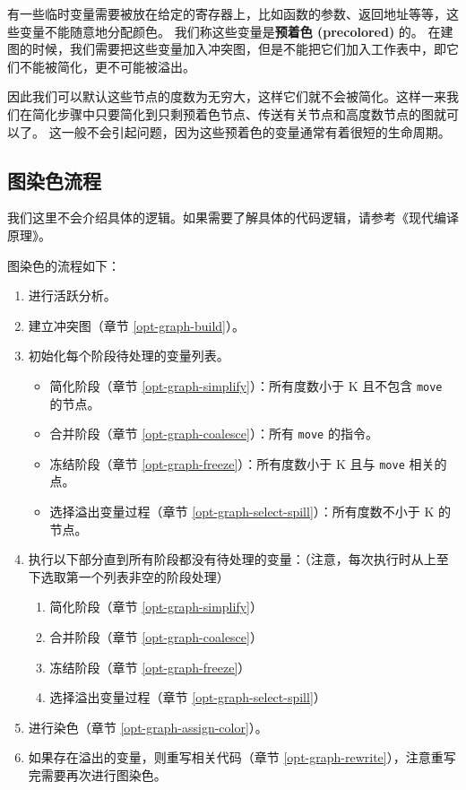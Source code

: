 有一些临时变量需要被放在给定的寄存器上，比如函数的参数、返回地址等等，这些变量不能随意地分配颜色。
我们称这些变量是\textbf{预着色 (precolored)} 的。
在建图的时候，我们需要把这些变量加入冲突图，但是不能把它们加入工作表中，即它们不能被简化，更不可能被溢出。

因此我们可以默认这些节点的度数为无穷大，这样它们就不会被简化。这样一来我们在简化步骤中只要简化到只剩预着色节点、传送有关节点和高度数节点的图就可以了。
这一般不会引起问题，因为这些预着色的变量通常有着很短的生命周期。

\subsection{图染色流程} \label{opt-graph-workflow}

\begin{remark}
我们这里不会介绍具体的逻辑。如果需要了解具体的代码逻辑，请参考《现代编译原理》\cite{TigerBook}。
\end{remark}

图染色的流程如下：
\begin{enumerate}
  \item 进行活跃分析。

  \item 建立冲突图（章节 \ref{opt-graph-build}）。

  \item 初始化每个阶段待处理的变量列表。
    \begin{itemize}
      \item 简化阶段（章节 \ref{opt-graph-simplify}）：所有度数小于 K 且不包含 \texttt{move} 的节点。
      \item 合并阶段（章节 \ref{opt-graph-coalesce}）：所有 \texttt{move} 的指令。
      \item 冻结阶段（章节 \ref{opt-graph-freeze}）：所有度数小于 K 且与 \texttt{move} 相关的点。
      \item 选择溢出变量过程（章节 \ref{opt-graph-select-spill}）：所有度数不小于 K 的节点。
    \end{itemize}

  \item 执行以下部分直到所有阶段都没有待处理的变量：（注意，每次执行时从上至下选取第一个列表非空的阶段处理）
    \begin{enumerate}
      \item 简化阶段（章节 \ref{opt-graph-simplify}）
      \item 合并阶段（章节 \ref{opt-graph-coalesce}）
      \item 冻结阶段（章节 \ref{opt-graph-freeze}）
      \item 选择溢出变量过程（章节 \ref{opt-graph-select-spill}）
    \end{enumerate}

  \item 进行染色（章节 \ref{opt-graph-assign-color}）。

  \item 如果存在溢出的变量，则重写相关代码（章节 \ref{opt-graph-rewrite}），注意重写完需要再次进行图染色。
\end{enumerate}

